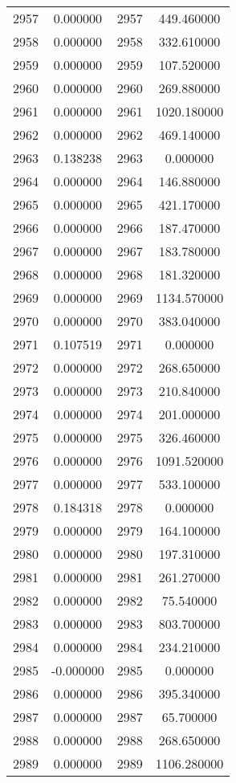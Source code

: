 \documentclass[12pt]{article}
\begin{document}
\begin{longtable}{@{}cccc@{}}
2957 & 0.000000 & 2957 & 449.460000 \\
2958 & 0.000000 & 2958 & 332.610000 \\
2959 & 0.000000 & 2959 & 107.520000 \\
2960 & 0.000000 & 2960 & 269.880000 \\
2961 & 0.000000 & 2961 & 1020.180000 \\
2962 & 0.000000 & 2962 & 469.140000 \\
2963 & 0.138238 & 2963 & 0.000000 \\
2964 & 0.000000 & 2964 & 146.880000 \\
2965 & 0.000000 & 2965 & 421.170000 \\
2966 & 0.000000 & 2966 & 187.470000 \\
2967 & 0.000000 & 2967 & 183.780000 \\
2968 & 0.000000 & 2968 & 181.320000 \\
2969 & 0.000000 & 2969 & 1134.570000 \\
2970 & 0.000000 & 2970 & 383.040000 \\
2971 & 0.107519 & 2971 & 0.000000 \\
2972 & 0.000000 & 2972 & 268.650000 \\
2973 & 0.000000 & 2973 & 210.840000 \\
2974 & 0.000000 & 2974 & 201.000000 \\
2975 & 0.000000 & 2975 & 326.460000 \\
2976 & 0.000000 & 2976 & 1091.520000 \\
2977 & 0.000000 & 2977 & 533.100000 \\
2978 & 0.184318 & 2978 & 0.000000 \\
2979 & 0.000000 & 2979 & 164.100000 \\
2980 & 0.000000 & 2980 & 197.310000 \\
2981 & 0.000000 & 2981 & 261.270000 \\
2982 & 0.000000 & 2982 & 75.540000 \\
2983 & 0.000000 & 2983 & 803.700000 \\
2984 & 0.000000 & 2984 & 234.210000 \\
2985 & -0.000000 & 2985 & 0.000000 \\
2986 & 0.000000 & 2986 & 395.340000 \\
2987 & 0.000000 & 2987 & 65.700000 \\
2988 & 0.000000 & 2988 & 268.650000 \\
2989 & 0.000000 & 2989 & 1106.280000 \\

\end{longtable}
\end{document}
